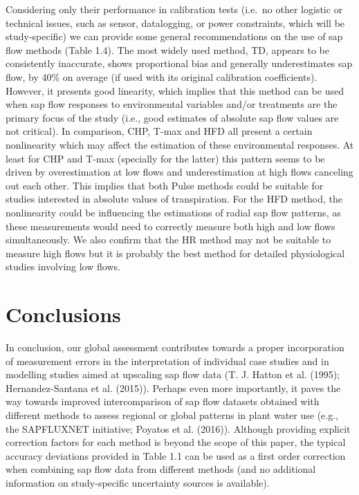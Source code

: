 \documentclass[11pt,twoside]{reedthesis}
\begin{document}
Considering only their performance in calibration tests (i.e.~no other
logistic or technical issues, such as sensor, datalogging, or power
constraints, which will be study-specific) we can provide some general
recommendations on the use of sap flow methods (Table 1.4). The most
widely used method, TD, appears to be consistently inaccurate, shows
proportional bias and generally underestimates sap flow, by 40\% on
average (if used with its original calibration coefficients). However,
it presents good linearity, which implies that this method can be used
when sap flow responses to environmental variables and/or treatments are
the primary focus of the study (i.e., good estimates of absolute sap
flow values are not critical). In comparison, CHP, T-max and HFD all
present a certain nonlinearity which may affect the estimation of these
environmental responses. At least for CHP and T-max (specially for the
latter) this pattern seems to be driven by overestimation at low flows
and underestimation at high flows canceling out each other. This implies
that both Pulse methods could be suitable for studies interested in
absolute values of transpiration. For the HFD method, the nonlinearity
could be influencing the estimations of radial sap flow patterns, as
these measurements would need to correctly measure both high and low
flows simultaneously. We also confirm that the HR method may not be
suitable to measure high flows but it is probably the best method for
detailed physiological studies involving low flows.\par

\section{Conclusions}\label{conclusions}

In conclusion, our global assessment contributes towards a proper
incorporation of measurement errors in the interpretation of individual
case studies and in modelling studies aimed at upscaling sap flow data
(T. J. Hatton et al. (1995); Hernandez-Santana et al. (2015)). Perhaps
even more importantly, it paves the way towards improved intercomparison
of sap flow datasets obtained with different methods to assess regional
or global patterns in plant water use (e.g., the SAPFLUXNET initiative;
Poyatos et al. (2016)). Although providing explicit correction factors
for each method is beyond the scope of this paper, the typical accuracy
deviations provided in Table 1.1 can be used as a first order correction
when combining sap flow data from different methods (and no additional
information on study-specific uncertainty sources is available).\par
\end{document}
